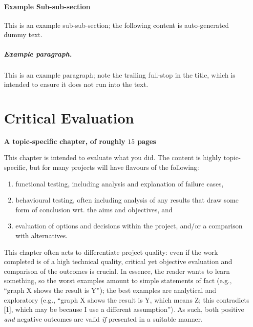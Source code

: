 \documentclass[ %
                    author={Ashwinder Khurana},
                supervisor={Prof Dave Cliff},
                    degree={MEng},
                     title={The Deeply Reinforced Trader},
                  subtitle={},
                      type={enterprise},
                      year={2020} ]{dissertation}
\begin{document}
\subsubsection{Example Sub-sub-section}

This is an example sub-sub-section;
the following content is auto-generated dummy text.
\lipsum

\paragraph{Example paragraph.}

This is an example paragraph; note the trailing full-stop in the title,
which is intended to ensure it does not run into the text.


\chapter{Critical Evaluation}
\label{chap:evaluation}

{\bf A topic-specific chapter, of roughly $15$ pages} 
\vspace{1cm} 

\noindent
This chapter is intended to evaluate what you did.  The content is highly 
topic-specific, but for many projects will have flavours of the following:

\begin{enumerate}
\item functional  testing, including analysis and explanation of failure 
      cases,
\item behavioural testing, often including analysis of any results that 
      draw some form of conclusion wrt. the aims and objectives,
      and
\item evaluation of options and decisions within the project, and/or a
      comparison with alternatives.
\end{enumerate}

\noindent
This chapter often acts to differentiate project quality: even if the work
completed is of a high technical quality, critical yet objective evaluation 
and comparison of the outcomes is crucial.  In essence, the reader wants to
learn something, so the worst examples amount to simple statements of fact 
(e.g., ``graph X shows the result is Y''); the best examples are analytical 
and exploratory (e.g., ``graph X shows the result is Y, which means Z; this 
contradicts [1], which may be because I use a different assumption'').  As 
such, both positive {\em and} negative outcomes are valid {\em if} presented 
in a suitable manner.
\end{document}
